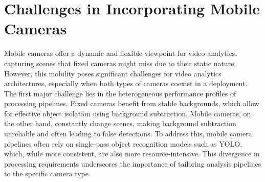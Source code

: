 



\section{Challenges in Incorporating Mobile Cameras}

Mobile cameras offer a dynamic and flexible viewpoint for video analytics, capturing scenes that fixed cameras might miss due to their static nature. However, this mobility poses significant challenges for video analytics architectures, especially when both types of cameras coexist in a deployment. The first major challenge lies in the heterogeneous performance profiles of processing pipelines. Fixed cameras benefit from stable backgrounds, which allow for effective object isolation using background subtraction. Mobile cameras, on the other hand, constantly change scenes, making background subtraction unreliable and often leading to false detections. To address this, mobile camera pipelines often rely on single-pass object recognition models such as YOLO, which, while more consistent, are also more resource-intensive. This divergence in processing requirements underscores the importance of tailoring analysis pipelines to the specific camera type.

